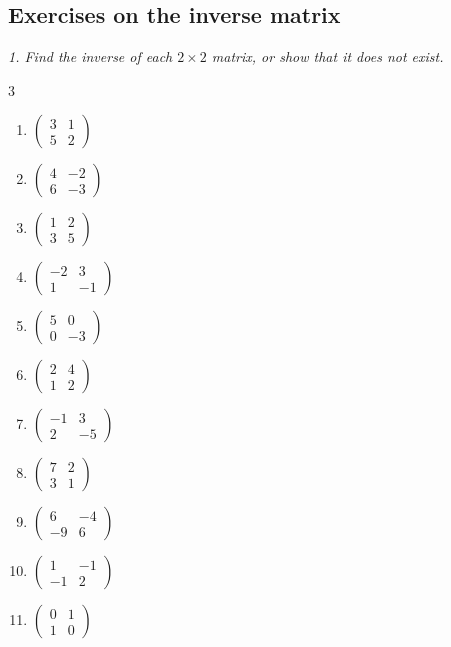 \subsection{Exercises on the inverse matrix}
\bigskip
\emph{1. Find the inverse of each $2\times 2$ matrix, or show that it does not exist.}
\bigskip
\begin{multicols}{3}\raggedright
\begin{enumerate}[label=\arabic*.,  leftmargin=*]
\item $\begin{pmatrix}3&1\\5&2\end{pmatrix}$
\item $\begin{pmatrix}4&-2\\6&-3\end{pmatrix}$
\item $\begin{pmatrix}1&2\\3&5\end{pmatrix}$
\item $\begin{pmatrix}-2&3\\1&-1\end{pmatrix}$
\item $\begin{pmatrix}5&0\\0&-3\end{pmatrix}$
\item $\begin{pmatrix}2&4\\1&2\end{pmatrix}$
\item $\begin{pmatrix}-1&3\\2&-5\end{pmatrix}$
\item $\begin{pmatrix}7&2\\3&1\end{pmatrix}$
\item $\begin{pmatrix}6&-4\\-9&6\end{pmatrix}$
\item $\begin{pmatrix}1&-1\\-1&2\end{pmatrix}$
\item $\begin{pmatrix}0&1\\1&0\end{pmatrix}$

\end{enumerate}
\end{multicols}
